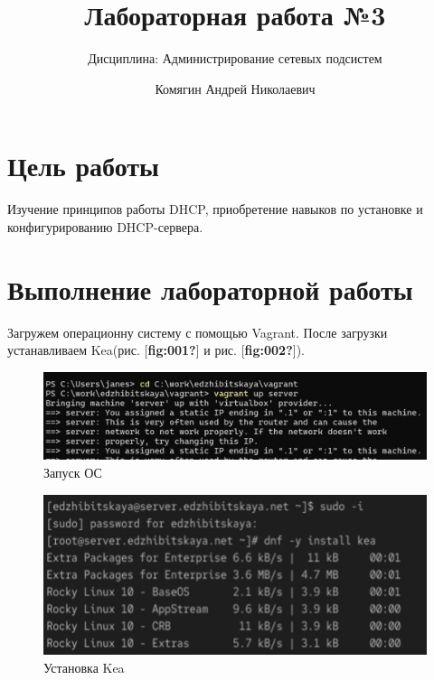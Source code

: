 \documentclass[
  english,
  russian,
  12pt,
  a4paper,
  DIV=11,
  numbers=noendperiod]{scrreprt}
\title{Лабораторная работа №3}
\subtitle{Дисциплина: Администрирование сетевых подсистем}
\author{Комягин Андрей Николаевич}
\date{}
\renewcommand*\contentsname{Содержание}
\newcommand\contentsname{Содержание}
\begin{document}
\maketitle

\renewcommand*\contentsname{Содержание}
{
\hypersetup{linkcolor=}
\setcounter{tocdepth}{1}
\tableofcontents
}
\listoffigures
\listoftables

\chapter{Цель
работы}\label{ux446ux435ux43bux44c-ux440ux430ux431ux43eux442ux44b}

Изучение принципов работы DHCP, приобретение навыков по установке и
конфигурированию DHCP-сервера.

\chapter{Выполнение лабораторной
работы}\label{ux432ux44bux43fux43eux43bux43dux435ux43dux438ux435-ux43bux430ux431ux43eux440ux430ux442ux43eux440ux43dux43eux439-ux440ux430ux431ux43eux442ux44b}

Загружем операционну систему с помощью Vagrant. После загрузки
устанавливаем Kea(рис. {[}\textbf{fig:001?}{]} и рис.
{[}\textbf{fig:002?}{]}).

\begin{figure}

{\centering \includegraphics[width=0.7\linewidth,height=\textheight,keepaspectratio]{image/1.jpg}

}

\caption{Запуск ОС}

\end{figure}%

\begin{figure}

{\centering \includegraphics[width=0.7\linewidth,height=\textheight,keepaspectratio]{image/2.jpg}

}

\caption{Установка Kea}

\end{figure}%
\end{document}
